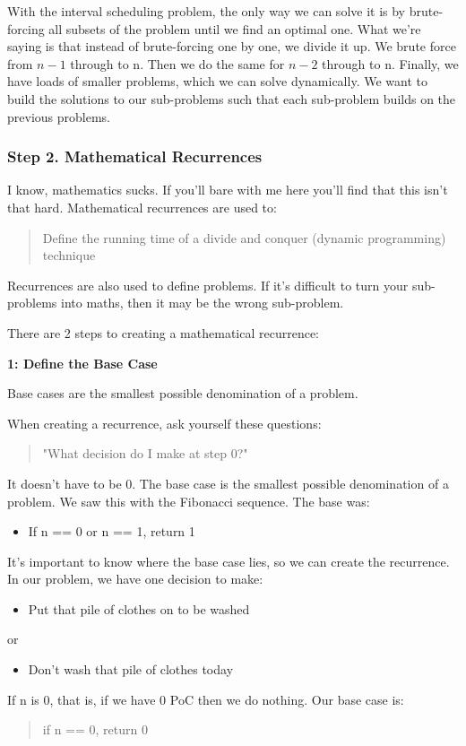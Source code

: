 \documentclass{article}
\begin{document}
With the interval scheduling problem, the only way we can solve it is by brute-forcing all subsets of the problem until we find an optimal one. What we're saying is that instead of brute-forcing one by one, we divide it up. We brute force from $n-1$ through to n. Then we do the same for $n - 2$ through to n. Finally, we have loads of smaller problems, which we can solve dynamically. We want to build the solutions to our sub-problems such that each sub-problem builds on the previous problems.
\newpage
\subsubsection{Step 2. Mathematical Recurrences}
I know, mathematics sucks. If you'll bare with me here you'll find that this isn't that hard. Mathematical recurrences are used to:
\begin{quote}
    Define the running time of a divide and conquer (dynamic programming) technique
\end{quote}
Recurrences are also used to define problems. If it's difficult to turn your sub-problems into maths, then it may be the wrong sub-problem.

There are 2 steps to creating a mathematical recurrence:

\textbf{1: Define the Base Case}

Base cases are the smallest possible denomination of a problem.

When creating a recurrence, ask yourself these questions:
\begin{quote}
    "What decision do I make at step 0?"
\end{quote}
It doesn't have to be 0. The base case is the smallest possible denomination of a problem. We saw this with the Fibonacci sequence. The base was:
\begin{itemize}
    \item If n == 0 or n == 1, return 1
\end{itemize}
It's important to know where the base case lies, so we can create the recurrence. In our problem, we have one decision to make:
\begin{itemize}
    \item Put that pile of clothes on to be washed
\end{itemize}
or
\begin{itemize}
    \item Don’t wash that pile of clothes today
\end{itemize}
If n is 0, that is, if we have 0 PoC then we do nothing. Our base case is:
\begin{quote}
    if n == 0, return 0
\end{quote}
\end{document}

